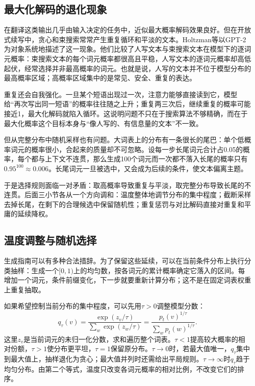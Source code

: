 \subsection{最大化解码的退化现象}
\label{sec:nlp-inference-degeneration}

在翻译这类输出几乎由输入决定的任务中，近似最大概率解码效果良好。但在开放式续写中，贪心和束搜索常常产生重复循环和平淡的文本。Holtzman等以GPT-2为对象系统地描述了这一现象。他们比较了人写文本与束搜索文本在模型下的逐词元概率：束搜索文本的每个词元概率都很高且平稳，人写文本的逐词元概率却高低起伏，经常选择并非最高概率的词元。也就是说，人写的文本并不位于模型分布的最高概率区域；高概率区域集中的是常见、安全、重复的表达。

重复还会自我强化。一旦某个短语出现过一次，注意力能够直接读到它，模型给“再次写出同一短语”的概率往往随之上升；重复两三次后，继续重复的概率可能接近1，最大化解码就陷入循环。这说明问题不只在于搜索算法不够精确，而在于最大化概率这个目标本身与“像人写的、有信息量的文本”不一致。

但从完整分布中随机采样也有问题。大词表上的分布有一条很长的尾巴：单个低概率词元的概率很小，合起来的质量却不可忽略。设每一步长尾词元合计占0.05的概率，每个都与上下文不连贯，那么生成100个词元而一次都不落入长尾的概率只有$0.95^{100}\approx0.006$。长尾词元一旦被选中，又会成为后续的条件，使文本偏离主题。

于是选择规则面临一对矛盾：取高概率导致重复与平淡，取完整分布导致长尾的不连贯。后面三小节各从一个方向调和：温度整体地调节分布的集中程度；截断采样去掉长尾，在剩下的合理候选中保留随机性；重复惩罚与对比解码直接对重复和平庸的延续降权。

\subsection{温度调整与随机选择}
\label{sec:nlp-inference-temperature}

生成指南可以有多种合法措辞。为了保留这些延续，可以在当前条件分布上执行分类抽样：生成一个$[0,1)$上的均匀数，按各词元的累计概率确定它落入的区间。每增加一个词元，条件前缀变化，下一步就要重新计算分布；这不是在固定词表权重上重复抽取。

如果希望控制当前分布的集中程度，可以先用$\tau>0$调整模型分数：
\begin{equation}
 q_\tau(v)=\frac{\exp(z_v/\tau)}{\sum_{w}\exp(z_w/\tau)}
 =\frac{p_t(v)^{1/\tau}}{\sum_{w}p_t(w)^{1/\tau}}.
 \label{eq:nlp-generation-temperature}
\end{equation}
这里$z_v$是当前词元的未归一化分数，求和遍历整个词表。$\tau<1$提高较大概率的相对份额，$\tau>1$使分布更平坦，$\tau=1$保留原分布。$\tau\to0$时，若最大值唯一，$q_\tau$集中到最大值上，抽样退化为贪心；最大值并列时还需给出平局规则。$\tau\to\infty$时$q_\tau$趋于均匀分布。由第二个等式，温度只改变各词元概率的相对比例，不改变它们的排序。

